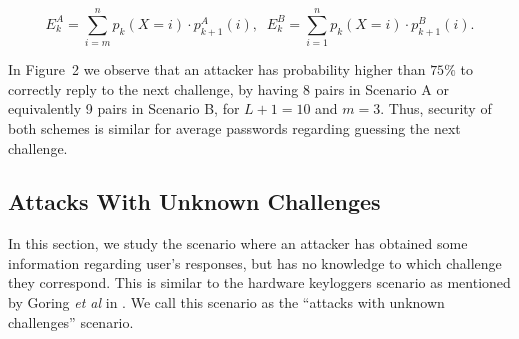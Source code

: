 \documentclass{llncs}
\begin{document}
\begin{equation}\label{eqq1}
  E^A_{k}=\sum_{i=m}^{n}p_{k}(X=i)\cdot p^A_{k+1}(i),\;\;E^B_{k}=\sum_{i=1}^{n}p_{k}(X=i)\cdot p^B_{k+1}(i).
\end{equation}



In Figure~2 we observe that an attacker has probability higher than $75\%$ to correctly
reply to the next challenge, by having 8 pairs in Scenario A
or equivalently 9 pairs in Scenario B, for $L+1=10$ and $m=3$. Thus,
security of both schemes is similar for average passwords regarding guessing the
next challenge.


\subsection{Attacks With Unknown Challenges } \label{sec22}

In this section, we study the scenario where an
attacker has obtained some information regarding
user's responses, but has no
knowledge to which challenge they correspond. This
is similar to the hardware keyloggers scenario
as mentioned by Goring \textit{et al} in \cite{CSGoring}.
We call this scenario as the
``attacks with unknown challenges'' scenario.
\end{document}
